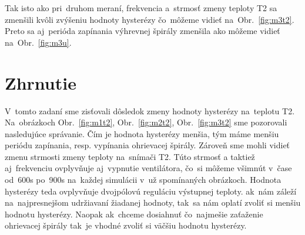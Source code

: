 \documentclass{article}
\begin{document}
Tak isto ako pri~druhom meraní, frekvencia a~strmosť zmeny teploty T2 sa zmenšili kvôli zvýšeniu hodnoty hysterézy
čo~môžeme vidieť na~Obr.~\ref{fig:m3t2}. Preto sa aj~perióda zapínania výhrevnej špirály zmenšila ako môžeme vidieť
na~Obr.~\ref{fig:m3u}.

\section{Zhrnutie}
\label{sec:zhrnutie}

V~tomto zadaní sme zisťovali dôsledok zmeny hodnoty hysterézy na~teplotu T2. Na~obrázkoch Obr.~\ref{fig:m1t2},
Obr.~\ref{fig:m2t2}, Obr.~\ref{fig:m3t2} sme pozorovali nasledujúce správanie. Čím je hodnota hysterézy menšia,
tým máme menšiu periódu zapínania, resp. vypínania ohrievacej špirály. Zároveň sme mohli vidieť zmenu strmosti
zmeny teploty na~snímači T2. Túto strmosť a taktiež aj~frekvenciu ovplyvňuje aj~vypnutie ventilátora, čo~si môžeme
všimnút v~čase od~600s po~900s na~každej simulácii v~už spomínaných obrázkoch. Hodnota hysterézy teda ovplyvňuje
dvojpólovú reguláciu výstupnej teploty. ak~nám záleží na~najpresnejšom udržiavaní žiadanej hodnoty, tak~sa nám
oplatí zvoliť si menšiu hodnotu hysterézy. Naopak ak~chceme dosiahnuť čo~najmešie zaťaženie ohrievacej špirály
tak~je vhodné zvoliť si väčšiu hodnotu hysterézy.
\end{document}
